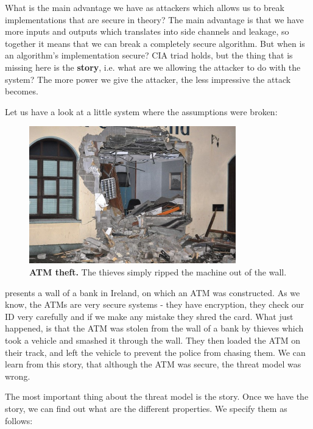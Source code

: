 What is the main advantage we have as attackers which allows us to break
implementations that are secure in theory? 
The main advantage is that we have more inputs and outputs which translates into side channels and leakage, so together it means that we can break a completely secure algorithm. 
But when is an algorithm's implementation secure? CIA triad holds, but the thing that is missing here is the \textbf{story}, i.e. what are we allowing the attacker to do with the system?
The more power we give the attacker, the less impressive the attack becomes. 

Let us have a look at a little system where the assumptions were broken:

\begin{figure}[!ht]
    \centering
    \includegraphics[width=0.8\textwidth]{images/ch1_Intro/Bank.jpg}
    \caption{\textbf{ATM theft.} The thieves simply ripped the machine out of the wall.}
    \label{fig:Bank}
\end{figure}

 presents a wall of a bank in Ireland, on which an ATM was
constructed. As we know, the ATMs are very secure systems - they have
encryption, they check our ID very carefully and if we make any mistake they
shred the card. What just happened, is that the ATM was stolen from the wall of a bank
by thieves which took a vehicle and smashed it through the wall. They then loaded the ATM on their track, and left the vehicle to prevent the police from chasing them. 
We can learn from this story, that although the ATM was secure, the threat model was wrong.

The most important thing about the threat model is the story. Once we have the story, we can find out what are the different properties. We specify them as follows:


